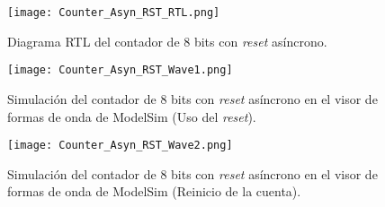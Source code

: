 \begin{figure}[ht]
	\centering
	\texttt{[image: Counter\_Asyn\_RST\_RTL.png]}
	\caption{Diagrama RTL del contador de 8 bits con \textit{reset} asíncrono. \label{fig:counter_asyn_rst_rtl}}
\end{figure}

\begin{figure}[ht]
	\centering
	\texttt{[image: Counter\_Asyn\_RST\_Wave1.png]}
	\caption{Simulación del contador de 8 bits con \textit{reset} asíncrono en el visor de formas de onda de ModelSim (Uso del \textit{reset}). \label{fig:counter_asyn_rst_wave1}}
\end{figure}

\begin{figure}[ht]
	\centering
	\texttt{[image: Counter\_Asyn\_RST\_Wave2.png]}
	\caption{Simulación del contador de 8 bits con \textit{reset} asíncrono en el visor de formas de onda de ModelSim (Reinicio de la cuenta). \label{fig:counter_asyn_rst_wave2}}
\end{figure}